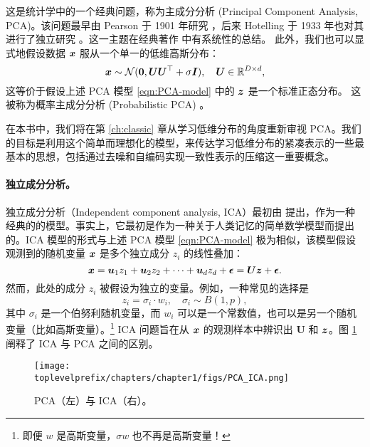 \documentclass[../../book-main_zh.tex]{subfiles}
\begin{document}
这是统计学中的一个经典问题，称为主成分分析 (Principal Component Analysis, PCA)。该问题最早由 Pearson 于 1901 年研究 \cite{Pearson1901}，后来 Hotelling 于 1933 年也对其进行了独立研究 \cite{Hotelling1933}。这一主题在经典著作 \cite{Jolliffe1986,JolliffeI2002} 中有系统性的总结。
此外，我们也可以显式地假设数据 $\bm{x}$ 服从一个单一的低维高斯分布：
\begin{equation}
    \bm{x} \sim \mathcal{N}(\boldsymbol{0}, \boldsymbol{U}\boldsymbol{U}^\top + \sigma \bm{I}), \quad \boldsymbol{U} \in \mathbb{R}^{D\times d},
\end{equation}
这等价于假设上述 PCA 模型 \eqref{eqn:PCA-model} 中的 $\bm{z}$ 是一个标准正态分布。
这被称为概率主成分分析 (Probabilistic PCA) \cite{TippingM1999}。

在本书中，我们将在第 \ref{ch:classic} 章从学习低维分布的角度重新审视 PCA。我们的目标是利用这个简单而理想化的模型，来传达学习低维分布的紧凑表示的一些最基本的思想，包括通过去噪和自编码实现一致性表示的压缩这一重要概念。

\paragraph{独立成分分析。}

独立成分分析（Independent component analysis, ICA）最初由 \cite{Ans-1985} 提出，作为一种经典的{}的模型。事实上，它最初是作为一种关于人类记忆的简单数学模型而提出的。ICA 模型的形式与上述 PCA 模型 \eqref{eqn:PCA-model} 极为相似，该模型假设观测到的随机变量 $\bm{x}$ 是多个独立成分 $z_i$ 的线性叠加：
\begin{equation}
    \bm{x} = \boldsymbol{u}_1 z_1 + \boldsymbol{u}_2 z_2 + \cdots + \boldsymbol{u}_d z_d  + \boldsymbol{\epsilon} =  \boldsymbol{U} \bm{z} + \boldsymbol{\epsilon}.
    \label{eqn:ICA-model}
\end{equation}
然而，此处的成分 $z_i$ 被假设为独立的{}变量。例如，一种常见的选择是
\begin{equation}
    z_i = \sigma_i \cdot w_i, \quad \sigma_i \sim B(1,p),
    \label{eqn:ICA-modes}
\end{equation}
其中 $\sigma_i$ 是一个伯努利随机变量，而 $w_i$ 可以是一个常数值，也可以是另一个随机变量（比如高斯变量）。\footnote{即便 $w$ 是高斯变量，$\sigma w$ 也不再是高斯变量！} ICA 问题旨在从 $\bm{x}$ 的观测样本中辨识出 $\boldsymbol{U}$ 和 $\bm{z}$。图 \ref{fig:ICA-PCA} 阐释了 ICA 与 PCA 之间的区别。

\begin{figure}
    \centering
    \texttt{[image: \\toplevelprefix/chapters/chapter1/figs/PCA\_ICA.png]}
    \caption{PCA（左）与 ICA（右）。}
    \label{fig:ICA-PCA}
\end{figure}
\end{document}
